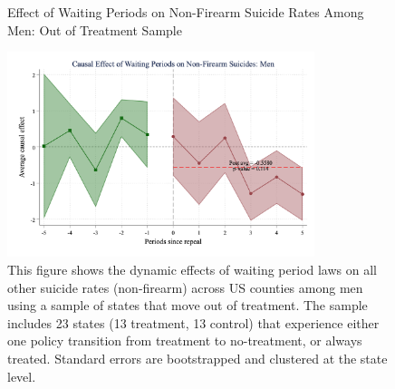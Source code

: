 \begin{figure}[htbp]
    \centering
    \caption{Effect of Waiting Periods on Non-Firearm Suicide Rates Among Men: Out of Treatment Sample}
    \label{fig:firearm_suicide_DID_other_men-out}
    \includegraphics[width=0.8\textwidth]{figures/1013-csid-outsample-men-other.png}
    \begin{minipage}{\linewidth}
    \caption*{\footnotesize{
    This figure shows the dynamic effects of waiting period laws on all other suicide rates (non-firearm) across US counties among men using a sample of states that move out of treatment. The sample includes 23 states (13 treatment, 13 control) that experience either one policy transition from treatment to no-treatment, or always treated. Standard errors are bootstrapped and clustered at the state level. }}
  \end{minipage}
\end{figure}

\pagebreak
\clearpage

